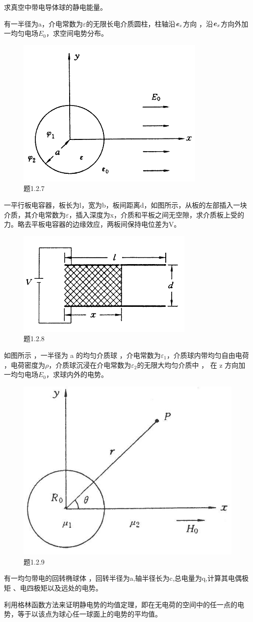 \begin{question}
求真空中带电导体球的静电能量。
\end{question}

\begin{question}
有一半径为a，介电常数为$\varepsilon$的无限长电介质圆柱，柱轴沿$\textbf{\textit{e}}_z$方向
，沿$\textbf{\textit{e}}_x$方向外加一均匀电场$E_0$，求空间电势分布。
\begin{figure}[ht]
\centering
\includegraphics[height=3 cm]{images/q1_2_7.png}
\caption{题1.2.7}
\end{figure}
\end{question}

\begin{question}
一平行板电容器，板长为l，宽为b，板间距离d，如图所示，从板的左部插入一块介质，其介电常数为$\varepsilon$，插入深度为x，介质和平板之间无空隙，求介质板上受的力。略去平板电容器的边缘效应，两板间保持电位差为V。
\begin{figure}[ht]
\centering
\includegraphics[height=3 cm]{images/q1_2_8.png}
\caption{题1.2.8}
\end{figure}
\end{question}

\begin{question}
如图所示 ，一半径为 a 的均匀介质球 ，介电常数为$\varepsilon_1$，介质球内带均匀自由电荷 ，电荷密度为$\rho$，介质球沉浸在介电常数为$\varepsilon_2$的无限大均匀介质中 ， 在 z 方向加一均匀电场$E_0$，求球内外的电势。
\begin{figure}[ht]
\centering
\includegraphics[height=3 cm]{images/q1_2_9.jpg}
\caption{题1.2.9}
\end{figure}
\end{question}

\begin{question}
有一均匀带电的回转椭球体 ，回转半径为a,轴半径长为c,总电量为q,计算其电偶极矩 、电四极矩以及远处的电势。
\end{question}

\begin{question}
利用格林函数方法来证明静电势的均值定理，即在无电荷的空间中的任一点的电势，等于以该点为球心任一球面上的电势的平均值。
\end{question}
